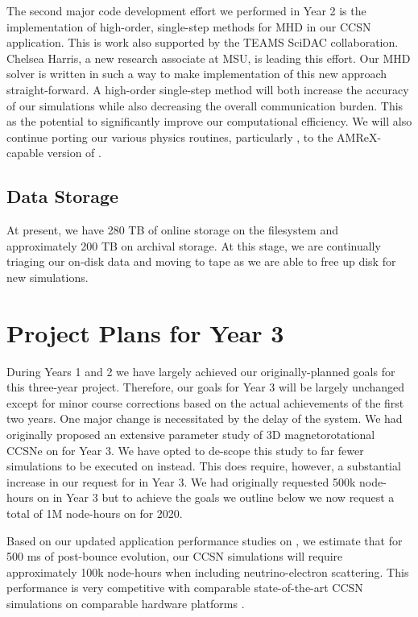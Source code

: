 \documentclass[12pt]{article}
\begin{document}
The second major code development effort we performed in Year 2 is the implementation of high-order, single-step methods for MHD in our CCSN application.
This is work also supported by the TEAMS SciDAC collaboration.
Chelsea Harris, a new research associate at MSU, is leading this effort. 
Our \spark MHD solver is written in such a way to make implementation of this new approach straight-forward. 
A high-order single-step method will both increase the accuracy of our simulations while also decreasing the overall communication burden. 
This as the potential to significantly improve our computational efficiency.
We will also continue porting our various physics routines, particularly \spark, to the AMReX-capable version of \flash.

\subsection{Data Storage}

At present, we have 280 TB of online storage on the \mira filesystem and approximately 200 TB on archival storage. 
At this stage, we are continually triaging our on-disk data and moving to tape as we are able to free up disk for new simulations.


\section{Project Plans for Year 3}

During Years 1 and 2 we have largely achieved our originally-planned goals for this three-year project.
Therefore, our goals for Year 3 will be largely unchanged except for minor course corrections based on the actual achievements of the first two years. 
One major change is necessitated by the delay of the \aurora system. 
We had originally proposed an extensive parameter study of 3D magnetorotational CCSNe on \aurora for Year 3.
We have opted to de-scope this study to far fewer simulations to be executed on \thet instead. 
This does require, however, a substantial increase in our request for \thet in Year 3. 
We had originally requested 500k node-hours on \thet in Year 3 but to achieve the goals we outline below we now request a total of 1M node-hours on \thet for 2020.

Based on our updated application performance studies on \thet, we estimate that for 500 ms of post-bounce evolution, our \sparkmone CCSN simulations will require approximately 100k node-hours when including neutrino-electron scattering.
This performance is very competitive with comparable state-of-the-art CCSN simulations on comparable hardware platforms \citep{vartanyan:2019}.
\end{document}
